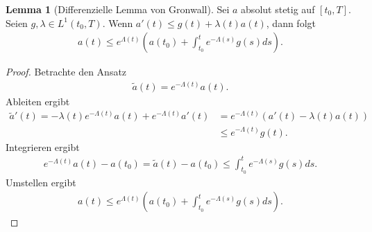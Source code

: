 \documentclass[a4paper]{article}
\theoremstyle{definition}
\newtheorem{lemma}[theorem]{Lemma}
\begin{document}
\begin{lemma}[Differenzielle Lemma von Gronwall]
Sei $a$ absolut stetig auf $[t_0, T]$. Seien $g, \lambda \in L^1(t_0, T)$. Wenn $a'(t) \leq g(t) + \lambda(t)a(t)$, dann folgt 
\begin{align*}
    a(t) \leq e^{\Lambda(t)}\left(a(t_0) + \int^t_{t_0} e^{-\Lambda(s)}g(s)ds\right).
\end{align*}
\end{lemma}

\begin{proof}
Betrachte den Ansatz 
\begin{align*}
    \tilde a(t) = e^{-\Lambda(t)}a(t).
\end{align*} 
Ableiten ergibt 
\begin{align*}
    \tilde a'(t) = -\lambda(t)e^{-\Lambda(t)}a(t) +   e^{-\Lambda(t)}a'(t)   
    &=    e^{-\Lambda(t)} (a'(t) - \lambda(t)a(t)) \\
    &\leq e^{-\Lambda(t)}g(t).
\end{align*}
Integrieren ergibt 
\begin{align*}
    e^{-\Lambda(t)}a(t) - a(t_0) = \tilde a(t) - a(t_0) \leq \int^t_{t_0} e^{-\Lambda(s)}g(s)ds.
\end{align*}
Umstellen ergibt 
\begin{align*}
    a(t) \leq e^{\Lambda(t)}\left(a(t_0) + \int^t_{t_0} e^{-\Lambda(s)} g(s) ds\right).
\end{align*}
\end{proof}
\end{document}
